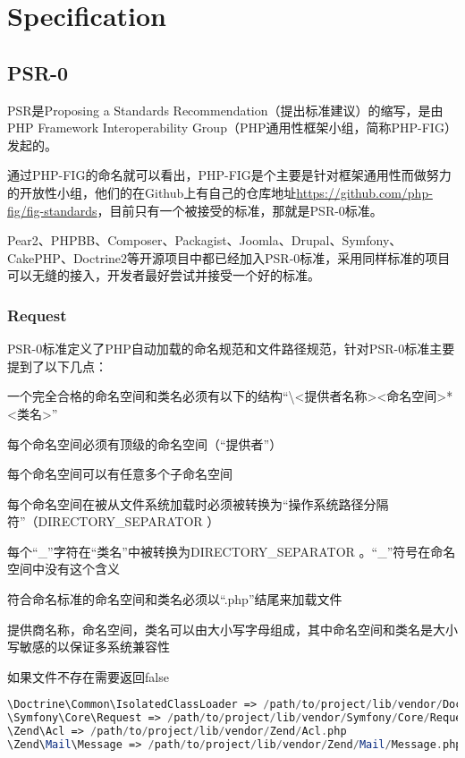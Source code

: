 \part{Specification}



\chapter{PSR-0}


PSR是Proposing a Standards Recommendation（提出标准建议）的缩写，是由PHP Framework Interoperability Group（PHP通用性框架小组，简称PHP-FIG）发起的。

通过PHP-FIG的命名就可以看出，PHP-FIG是个主要是针对框架通用性而做努力的开放性小组，他们的在Github上有自己的仓库地址\url{https://github.com/php-fig/fig-standards}，目前只有一个被接受的标准，那就是PSR-0标准。

Pear2、PHPBB、Composer、Packagist、Joomla、Drupal、Symfony、CakePHP、Doctrine2等开源项目中都已经加入PSR-0标准，采用同样标准的项目可以无缝的接入，开发者最好尝试并接受一个好的标准。

\section{Request}

PSR-0标准定义了PHP自动加载的命名规范和文件路径规范，针对PSR-0标准主要提到了以下几点：

\begin{compactitem}
\item 一个完全合格的命名空间和类名必须有以下的结构“\textbackslash <提供者名称><命名空间>*<类名>”
\item 每个命名空间必须有顶级的命名空间（“提供者”）
\item 每个命名空间可以有任意多个子命名空间
\item 每个命名空间在被从文件系统加载时必须被转换为“操作系统路径分隔符”（DIRECTORY\_SEPARATOR ）
\item 每个“\_”字符在“类名”中被转换为DIRECTORY\_SEPARATOR 。“\_”符号在命名空间中没有这个含义
\item 符合命名标准的命名空间和类名必须以“.php”结尾来加载文件
\item 提供商名称，命名空间，类名可以由大小写字母组成，其中命名空间和类名是大小写敏感的以保证多系统兼容性
\item 如果文件不存在需要返回false
\end{compactitem}


\begin{lstlisting}[language=PHP]
\Doctrine\Common\IsolatedClassLoader => /path/to/project/lib/vendor/Doctrine/Common/IsolatedClassLoader.php
\Symfony\Core\Request => /path/to/project/lib/vendor/Symfony/Core/Request.php
\Zend\Acl => /path/to/project/lib/vendor/Zend/Acl.php
\Zend\Mail\Message => /path/to/project/lib/vendor/Zend/Mail/Message.php
\end{lstlisting}



